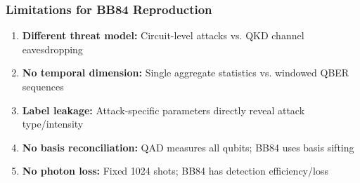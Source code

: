 \subsubsection{Limitations for BB84 Reproduction}
\begin{enumerate}
    \item \textbf{Different threat model:} Circuit-level attacks vs. QKD channel eavesdropping
    \item \textbf{No temporal dimension:} Single aggregate statistics vs. windowed QBER sequences
    \item \textbf{Label leakage:} Attack-specific parameters directly reveal attack type/intensity
    \item \textbf{No basis reconciliation:} QAD measures all qubits; BB84 uses basis sifting
    \item \textbf{No photon loss:} Fixed 1024 shots; BB84 has detection efficiency/loss
\end{enumerate}